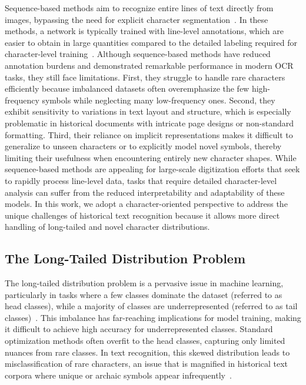 Sequence-based methods aim to recognize entire lines of text directly from images, bypassing the need for explicit character segmentation~\cite{eccvfork,jinic21}. In these methods, a network is typically trained with line-level annotations, which are easier to obtain in large quantities compared to the detailed labeling required for character-level training~\cite{adams2019sequence}. Although sequence-based methods have reduced annotation burdens and demonstrated remarkable performance in modern OCR tasks, they still face limitations. First, they struggle to handle rare characters efficiently because imbalanced datasets often overemphasize the few high-frequency symbols while neglecting many low-frequency ones. Second, they exhibit sensitivity to variations in text layout and structure, which is especially problematic in historical documents with intricate page designs or non-standard formatting. Third, their reliance on implicit representations makes it difficult to generalize to unseen characters or to explicitly model novel symbols, thereby limiting their usefulness when encountering entirely new character shapes. While sequence-based methods are appealing for large-scale digitization efforts that seek to rapidly process line-level data, tasks that require detailed character-level analysis can suffer from the reduced interpretability and adaptability of these models. In this work, we adopt a character-oriented perspective to address the unique challenges of historical text recognition because it allows more direct handling of long-tailed and novel character distributions.

\subsection{The Long-Tailed Distribution Problem}

The long-tailed distribution problem is a pervasive issue in machine learning, particularly in tasks where a few classes dominate the dataset (referred to as head classes), while a majority of classes are underrepresented (referred to as tail classes)~\cite{tailsurvey}. This imbalance has far-reaching implications for model training, making it difficult to achieve high accuracy for underrepresented classes. Standard optimization methods often overfit to the head classes, capturing only limited nuances from rare classes. In text recognition, this skewed distribution leads to misclassification of rare characters, an issue that is magnified in historical text corpora where unique or archaic symbols appear infrequently~\cite{garcia2018improved}.

